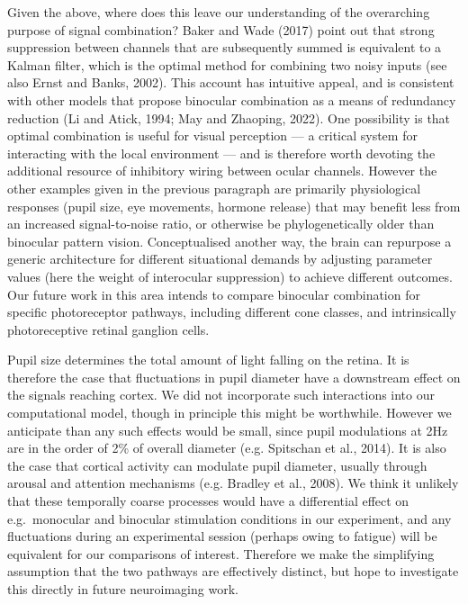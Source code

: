 \documentclass[
]{article}
\begin{document}
Given the above, where does this leave our understanding of the overarching purpose of signal combination? Baker and Wade (2017) point out that strong suppression between channels that are subsequently summed is equivalent to a Kalman filter, which is the optimal method for combining two noisy inputs (see also Ernst and Banks, 2002). This account has intuitive appeal, and is consistent with other models that propose binocular combination as a means of redundancy reduction (Li and Atick, 1994; May and Zhaoping, 2022). One possibility is that optimal combination is useful for visual perception --- a critical system for interacting with the local environment --- and is therefore worth devoting the additional resource of inhibitory wiring between ocular channels. However the other examples given in the previous paragraph are primarily physiological responses (pupil size, eye movements, hormone release) that may benefit less from an increased signal-to-noise ratio, or otherwise be phylogenetically older than binocular pattern vision. Conceptualised another way, the brain can repurpose a generic architecture for different situational demands by adjusting parameter values (here the weight of interocular suppression) to achieve different outcomes. Our future work in this area intends to compare binocular combination for specific photoreceptor pathways, including different cone classes, and intrinsically photoreceptive retinal ganglion cells.

Pupil size determines the total amount of light falling on the retina. It is therefore the case that fluctuations in pupil diameter have a downstream effect on the signals reaching cortex. We did not incorporate such interactions into our computational model, though in principle this might be worthwhile. However we anticipate than any such effects would be small, since pupil modulations at 2Hz are in the order of 2\% of overall diameter (e.g. Spitschan et al., 2014). It is also the case that cortical activity can modulate pupil diameter, usually through arousal and attention mechanisms (e.g. Bradley et al., 2008). We think it unlikely that these temporally coarse processes would have a differential effect on e.g.~monocular and binocular stimulation conditions in our experiment, and any fluctuations during an experimental session (perhaps owing to fatigue) will be equivalent for our comparisons of interest. Therefore we make the simplifying assumption that the two pathways are effectively distinct, but hope to investigate this directly in future neuroimaging work.
\end{document}
